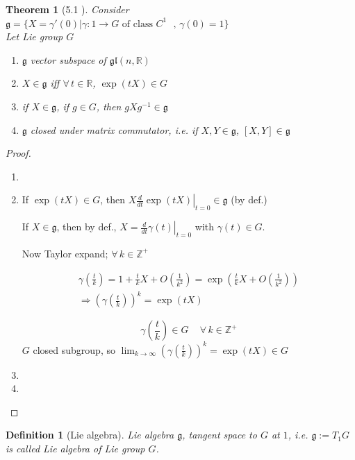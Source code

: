 \documentclass[10pt]{amsart}
\newtheorem{theorem}{Theorem}
\newtheorem{definition}{Definition}
\begin{document}
\begin{multicols*}{2}
\begin{theorem}[5.1 \cite{YKosmann-Schwarzbach2010}]\label{Thm:5.1YKos}
	Consider $\mathfrak{g} = \lbrace X = \gamma'(0) | \gamma : 1 \to G \text{ of class $C^1$ }, \, \gamma(0) = 1 \rbrace$ \\
	Let Lie group $G$
	\begin{enumerate}
		\item[(i)] $\mathfrak{g}$ vector subspace of $\mathfrak{gl}(n,\mathbb{R})$
		\item[(ii)] $X \in \mathfrak{g}$ iff $\forall \, t \in \mathbb{R}$, $\exp{(tX)} \in G$ 
		\item[(iii)] if $X \in \mathfrak{g}$, if $g\in G$, then $gXg^{-1} \in \mathfrak{g}$
		\item[(iv)] $\mathfrak{g}$ closed under matrix commutator, i.e. if $X,Y \in \mathfrak{g}$, $[X,Y] \in \mathfrak{g}$
	\end{enumerate}
\end{theorem}

\begin{proof}
	\begin{enumerate}
		\item[(i)]
		\item[(ii)] If $\exp{ (tX)} \in G$, then $X \left. \frac{d}{dt} \exp{(tX)} \right|_{t=0} \in \mathfrak{g}$ (by def.)
		
		If $X \in \mathfrak{g}$, then by def., $X = \left. \frac{d}{dt} \gamma(t) \right|_{t=0}$ with $\gamma(t) \in G$.  
		
		Now Taylor expand; $\forall \, k \in \mathbb{Z}^+$ 
		
		\[
		\begin{gathered}
		\gamma\left( \frac{t}{k} \right) = 1 + \frac{t}{k} X + O\left( \frac{1}{k^2} \right) = \exp{ \left( \frac{t}{k} X + O\left( \frac{1}{k^2} \right) \right) } \\
		\Longrightarrow \left( \gamma \left( \frac{t}{k} \right) \right)^k = \exp{ (tX)}
		\end{gathered}
		\]
		
		\[
		\gamma\left( \frac{t}{k} \right) \in G \quad \, \forall \, k \in \mathbb{Z}^+
		\]
		$G$ closed subgroup, so $\lim_{k \to \infty} (\gamma\left( \frac{t}{k} \right) )^k = \exp{(tX) } \in G$
		\item[(iii)]
		\item[(iv)]
	\end{enumerate}
\end{proof}

\begin{definition}[Lie algebra]
	Lie algebra $\mathfrak{g}$, tangent space to $G$ at $1$, i.e. $\mathfrak{g} := T_1 G$ is called \emph{Lie algebra} of Lie group $G$.  
	

\end{definition}
\end{multicols*}
\end{document}
